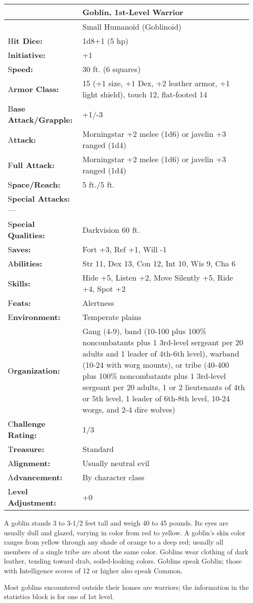 \documentclass{article}
\begin{document}
\begin{tabular}{|>{\raggedright}p{73pt}|>{\raggedright}p{252pt}|}
\hline
  & Goblin, 1st-Level Warrior\tabularnewline
\hline
  & Small Humanoid (Goblinoid)\tabularnewline
\hline
H\textbf{it Dice:} & 1d8+1 (5 hp)\tabularnewline
\hline
I\textbf{nitiative:} & +1\tabularnewline
\hline
S\textbf{peed:} & 30 ft. (6 squares)\tabularnewline
\hline
A\textbf{rmor Class:} & 15 (+1 size, +1 Dex, +2 leather armor, +1 light shield), 
touch 12, flat-footed 14\tabularnewline
\hline
B\textbf{ase Attack/Grapple:} & +1/-3\tabularnewline
\hline
A\textbf{ttack:} & Morningstar +2 melee (1d6) or javelin +3 ranged (1d4)\tabularnewline
\hline
F\textbf{ull Attack:} & Morningstar +2 melee (1d6) or javelin +3 ranged (1d4)\tabularnewline
\hline
S\textbf{pace/Reach:} & 5 ft./5 ft.\tabularnewline
\hline
S\textbf{pecial Attacks:}--- & \tabularnewline
\hline
S\textbf{pecial Qualities:} & Darkvision 60 ft.\tabularnewline
\hline
S\textbf{aves:} & Fort +3, Ref +1, Will -1\tabularnewline
\hline
A\textbf{bilities:} & Str 11, Dex 13, Con 12, Int 10, Wis 9, Cha 6\tabularnewline
\hline
S\textbf{kills:} & Hide +5, Listen +2, Move Silently +5, Ride +4, Spot +2\tabularnewline
\hline
F\textbf{eats:} & Alertness\tabularnewline
\hline
E\textbf{nvironment:} & Temperate plains\tabularnewline
\hline
O\textbf{rganization:} & Gang (4-9), band (10-100 plus 100\% noncombatants plus 
1 3rd-level sergeant per 20 adults and 1 leader of 4th-6th level), warband (10-24 
with worg mounts), or tribe (40-400 plus 100\% noncombatants plus 1 3rd-level sergeant 
per 20 adults, 1 or 2 lieutenants of 4th or 5th level, 1 leader of 6th-8th level, 
10-24 worgs, and 2-4 dire wolves)\tabularnewline
\hline
C\textbf{hallenge Rating:} & 1/3\tabularnewline
\hline
T\textbf{reasure:} & Standard\tabularnewline
\hline
A\textbf{lignment:} & Usually neutral evil\tabularnewline
\hline
A\textbf{dvancement:} & By character class\tabularnewline
\hline
L\textbf{evel Adjustment:} & +0\tabularnewline
\hline
\end{tabular}

A goblin stands 3 to 3-1/2 feet tall and weigh 40 to 45 pounds. Its eyes are usually 
dull and glazed, varying in color from red to yellow. A goblin's skin color ranges 
from yellow through any shade of orange to a deep red; usually all members of a 
single tribe are about the same color. Goblins wear clothing of dark leather, tending 
toward drab, soiled-looking colors. Goblins speak Goblin; those with Intelligence 
scores of 12 or higher also speak Common.

Most goblins encountered outside their homes are warriors; the information in the 
statistics block is for one of 1st level.
\end{document}
